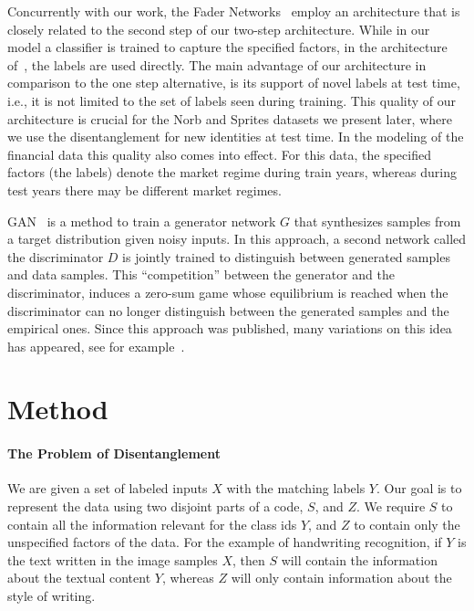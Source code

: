 \documentclass[10pt,twocolumn,letterpaper]{article}
\begin{document}
Concurrently with our work, the Fader Networks~\cite{fader} employ an architecture that is closely related to the second step of our two-step architecture. While in our model a classifier is trained to capture the specified factors, in the architecture of~\cite{fader}, the labels are used directly. The main advantage of our architecture in comparison to the one step alternative, is its support of novel labels at test time, i.e., it is not limited to the set of labels seen during training. This quality of our architecture is crucial for the Norb and Sprites datasets we present later, where we use the disentanglement for new identities at test time. In the modeling of the financial data this quality also comes into effect. For this data, the specified factors (the labels) denote the market regime during train years, whereas during test years there may be different market regimes.

 GAN~\cite{gan} is a method to train a generator network $G$ that synthesizes samples from a target distribution given noisy inputs. In this approach, a second network called the discriminator $D$ is jointly trained to distinguish between generated samples and data samples. This ``competition'' between the generator and the discriminator, induces a zero-sum game whose equilibrium is reached when the discriminator can no longer distinguish between the generated samples and the empirical ones. Since this approach was published, many variations on this idea has appeared, see for example~\cite{radford,denton2015deep,infogan}. 

\section{Method}

\paragraph{The Problem of Disentanglement}
We are given a set of labeled inputs $X$ with the matching labels $Y$. Our goal is to represent the data using two disjoint parts of a code, $S$, and $Z$. We require $S$ to contain all the information relevant for the class ids $Y$, and $Z$ to contain only the unspecified factors of the data. For the example of handwriting recognition, if $Y$ is the text written in the image samples $X$, then $S$ will contain the information about the textual content $Y$, whereas $Z$ will only contain information about the style of writing. 
\end{document}
